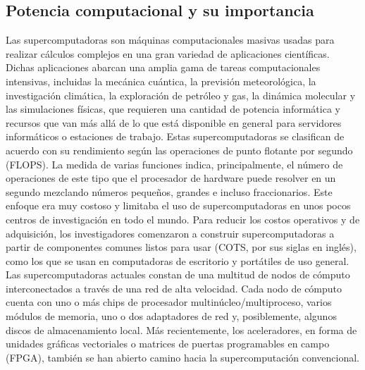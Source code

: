 \documentclass[11pt, letterpaper, spanish]{article}
\begin{document}
{   \subsection{Potencia computacional y su importancia}
    
\par{Las supercomputadoras son máquinas computacionales masivas usadas para realizar cálculos complejos en una gran variedad de aplicaciones científicas. Dichas aplicaciones abarcan una amplia gama de tareas computacionales intensivas, incluidas la mecánica cuántica, la previsión meteorológica, la investigación climática, la exploración de petróleo y gas, la dinámica molecular y las simulaciones físicas, que requieren una cantidad de potencia informática y recursos que van más allá de lo que está disponible en general para servidores informáticos o estaciones de trabajo. Estas supercomputadoras se clasifican de acuerdo con su rendimiento según las operaciones de punto flotante por segundo (FLOPS). La medida de varias funciones indica, principalmente, el número de operaciones de este tipo que el procesador de hardware puede resolver en un segundo mezclando números pequeños, grandes e incluso fraccionarios. Este enfoque era muy costoso y limitaba el uso de supercomputadoras en unos pocos centros de investigación en todo el mundo. Para reducir los costos operativos y de adquisición, los investigadores comenzaron a construir supercomputadoras a partir de componentes comunes listos para usar (COTS, por sus siglas en inglés), como los que se usan en computadoras de escritorio y portátiles de uso general. Las supercomputadoras actuales constan de una multitud de nodos de cómputo interconectados a través de una red de alta velocidad. Cada nodo de cómputo cuenta con uno o más chips de procesador multinúcleo/multiproceso, varios módulos de memoria, uno o dos adaptadores de red y, posiblemente, algunos discos de almacenamiento local. Más recientemente, los aceleradores, en forma de unidades gráficas vectoriales o matrices de puertas programables en campo (FPGA), también se han abierto camino hacia la supercomputación convencional.}
 

}
\end{document}
